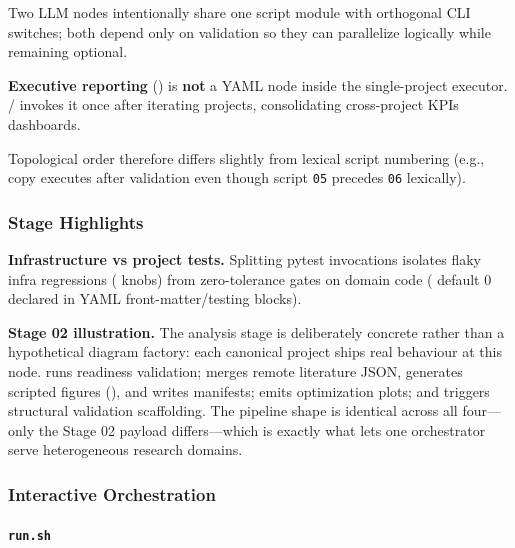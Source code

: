 \documentclass[
  english,
]{article}
\begin{document}
Two LLM nodes intentionally share one script module with orthogonal CLI
switches; both depend only on validation so they can parallelize
logically while remaining optional.

\textbf{Executive reporting}
() is
\textbf{not} a YAML node inside the single-project executor.
 /  invokes
it once after iterating projects, consolidating cross-project KPIs
dashboards.

Topological order therefore differs slightly from lexical script
numbering (e.g., copy executes after validation even though script
\texttt{05} precedes \texttt{06} lexically).

\subsubsection{Stage Highlights}\label{stage-highlights}

\textbf{Infrastructure vs project tests.} Splitting pytest invocations
isolates flaky infra regressions ( knobs)
from zero-tolerance gates on domain code
( default 0 declared in YAML
front-matter/testing blocks).

\textbf{Stage 02 illustration.} The analysis stage is deliberately
concrete rather than a hypothetical diagram factory: each canonical
project ships real behaviour at this node.
 runs readiness validation;
 merges remote literature JSON,
generates scripted figures (),
and writes manifests;  emits
optimization plots; and  triggers
structural validation scaffolding. The pipeline shape is identical
across all four---only the Stage 02 payload differs---which is exactly
what lets one orchestrator serve heterogeneous research domains.

\subsubsection{Interactive
Orchestration}\label{interactive-orchestration}

\paragraph{\texorpdfstring{\texttt{run.sh}}{run.sh}}\label{run.sh}
\end{document}
